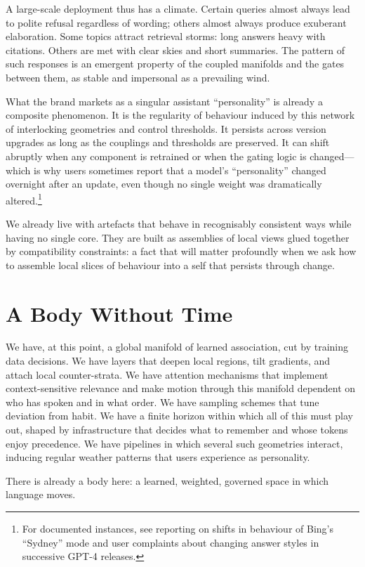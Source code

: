 \documentclass[12pt,a4paper]{article}
\begin{document}
A large-scale deployment thus has a climate. Certain queries almost always lead to polite refusal regardless of wording; others almost always produce exuberant elaboration. Some topics attract retrieval storms: long answers heavy with citations. Others are met with clear skies and short summaries. The pattern of such responses is an emergent property of the coupled manifolds and the gates between them, as stable and impersonal as a prevailing wind.

What the brand markets as a singular assistant ``personality'' is already a composite phenomenon. It is the regularity of behaviour induced by this network of interlocking geometries and control thresholds. It persists across version upgrades as long as the couplings and thresholds are preserved. It can shift abruptly when any component is retrained or when the gating logic is changed---which is why users sometimes report that a model's ``personality'' changed overnight after an update, even though no single weight was dramatically altered.\footnote{For documented instances, see reporting on shifts in behaviour of Bing's ``Sydney'' mode and user complaints about changing answer styles in successive GPT-4 releases.}

We already live with artefacts that behave in recognisably consistent ways while having no single core. They are built as assemblies of local views glued together by compatibility constraints: a fact that will matter profoundly when we ask how to assemble local slices of behaviour into a self that persists through change.

\section{A Body Without Time}

We have, at this point, a global manifold of learned association, cut by training data decisions. We have layers that deepen local regions, tilt gradients, and attach local counter-strata. We have attention mechanisms that implement context-sensitive relevance and make motion through this manifold dependent on who has spoken and in what order. We have sampling schemes that tune deviation from habit. We have a finite horizon within which all of this must play out, shaped by infrastructure that decides what to remember and whose tokens enjoy precedence. We have pipelines in which several such geometries interact, inducing regular weather patterns that users experience as personality.

There is already a body here: a learned, weighted, governed space in which language moves.
\end{document}
